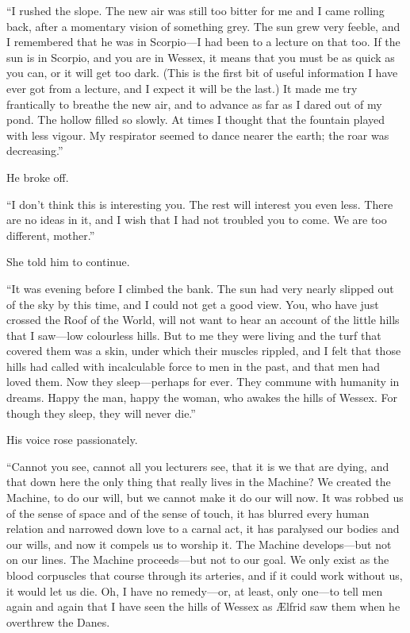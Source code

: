 ``I rushed the slope. The new air was still too bitter for me and I came rolling back, after a momentary vision of something grey. The sun grew very feeble, and I remembered that he was in Scorpio---I had been to a lecture on that too. If the sun is in Scorpio, and you are in Wessex, it means that you must be as quick as you can, or it will get too dark. (This is the first bit of useful information I have ever got from a lecture, and I expect it will be the last.) It made me try frantically to breathe the new air, and to advance as far as I dared out of my pond. The hollow filled so slowly. At times I thought that the fountain played with less vigour. My respirator seemed to dance nearer the earth; the roar was decreasing.''

He broke off.

``I don't think this is interesting you. The rest will interest you even less. There are no ideas in it, and I wish that I had not troubled you to come. We are too different, mother.''

She told him to continue.

``It was evening before I climbed the bank. The sun had very nearly slipped out of the sky by this time, and I could not get a good view. You, who have just crossed the Roof of the World, will not want to hear an account of the little hills that I saw---low colourless hills. But to me they were living and the turf that covered them was a skin, under which their muscles rippled, and I felt that those hills had called with incalculable force to men in the past, and that men had loved them. Now they sleep---perhaps for ever. They commune with humanity in dreams. Happy the man, happy the woman, who awakes the hills of Wessex. For though they sleep, they will never die.''

His voice rose passionately.

``Cannot you see, cannot all you lecturers see, that it is we that are dying, and that down here the only thing that really lives in the Machine? We created the Machine, to do our will, but we cannot make it do our will now. It was robbed us of the sense of space and of the sense of touch, it has blurred every human relation and narrowed down love to a carnal act, it has paralysed our bodies and our wills, and now it compels us to worship it. The Machine develops---but not on our lines. The Machine proceeds---but not to our goal. We only exist as the blood corpuscles that course through its arteries, and if it could work without us, it would let us die. Oh, I have no remedy---or, at least, only one---to tell men again and again that I have seen the hills of Wessex as \AE lfrid saw them when he overthrew the Danes.

